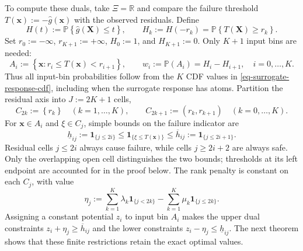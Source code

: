 To compute these duals, take $\Xi=\mathbb R$ and compare the failure threshold $T(\bm x):=-\hat g(\bm x)$ with the observed residuals. Define
\begin{equation}
  H(t):=\mathbb P\left\{\hat g(\bm X)\le t\right\},\qquad
  H_k:=H(-r_k)=\mathbb P\left\{T(\bm X)\ge r_k\right\}.
  \label{eq-surrogate-response-cdf}
\end{equation}
Set $r_0:=-\infty$, $r_{K+1}:=+\infty$, $H_0:=1$, and $H_{K+1}:=0$. Only $K+1$ input bins are needed:
\begin{equation}
  A_i:=\left\{\bm x:r_i\le T(\bm x)<r_{i+1}\right\},\qquad
  w_i:=\mathbb P\left(A_i\right)=H_i-H_{i+1},\quad i=0,\ldots,K.
  \label{eq-input-cells}
\end{equation}
Thus all input-bin probabilities follow from the $K$ CDF values in \eqref{eq-surrogate-response-cdf}, including when the surrogate response has atoms. Partition the residual axis into $J:=2K+1$ cells,
\begin{equation}
  C_{2k}:=\left\{r_k\right\}\quad(k=1,\ldots,K),\qquad
  C_{2k+1}:=\left(r_k,r_{k+1}\right)\quad(k=0,\ldots,K).
  \label{eq-residual-cells}
\end{equation}
For $\bm x\in A_i$ and $\xi\in C_j$, simple bounds on the failure indicator are
\begin{equation}
  \underline h_{ij}:=\mathbf1_{\{j\le2i\}}
  \le\mathbf1_{\{\xi\le T(\bm x)\}}
  \le\overline h_{ij}:=\mathbf1_{\{j\le2i+1\}}.
  \label{eq-cell-costs}
\end{equation}
Residual cells $j\le2i$ always cause failure, while cells $j\ge2i+2$ are always safe. Only the overlapping open cell distinguishes the two bounds; thresholds at its left endpoint are accounted for in the proof below. The rank penalty is constant on each $C_j$, with value
\begin{equation}
  \eta_j:=\sum_{k=1}^K\lambda_k\mathbf1_{\{j<2k\}}
  -\sum_{k=1}^K\mu_k\mathbf1_{\{j\le2k\}}.
  \label{eq-dual-cell-values}
\end{equation}
Assigning a constant potential $z_i$ to input bin $A_i$ makes the upper dual constraints $z_i+\eta_j\ge\overline h_{ij}$ and the lower constraints $z_i-\eta_j\le\underline h_{ij}$. The next theorem shows that these finite restrictions retain the exact optimal values.

